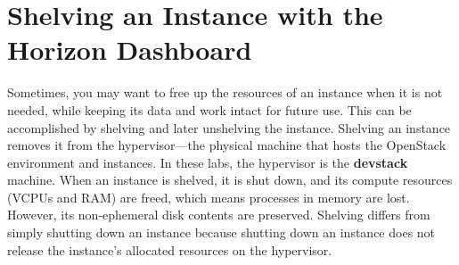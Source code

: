 \documentclass[letterpaper, 12pt]{article}
\begin{document}
\section{Shelving an Instance with the Horizon Dashboard}\label{sec:shelving_an_instance_with_the_horizon_dashboard}
Sometimes, you may want to free up the resources of an instance when it is not needed, while keeping its data and work intact for future use.
This can be accomplished by shelving and later unshelving the instance.
Shelving an instance removes it from the hypervisor---the physical machine that hosts the OpenStack environment and instances.
In these labs, the hypervisor is the \textbf{devstack} machine.
When an instance is shelved, it is shut down, and its compute resources (VCPUs and RAM) are freed, which means processes in memory are lost.
However, its non-ephemeral disk contents are preserved.
Shelving differs from simply shutting down an instance because shutting down an instance does not release the instance's allocated resources on the hypervisor.
\end{document}
